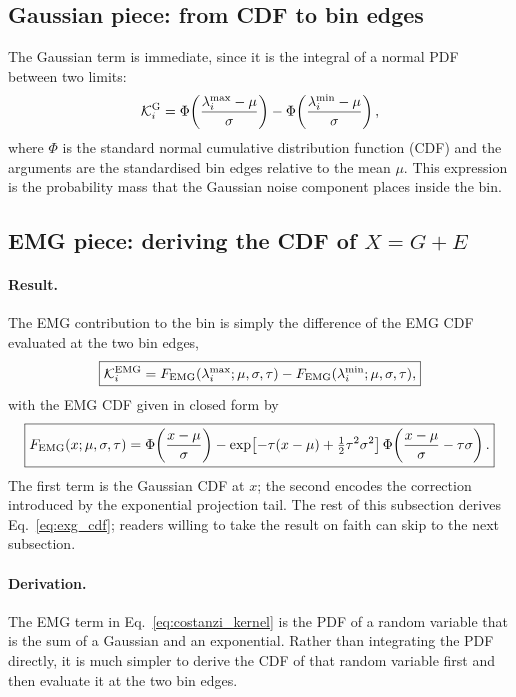 \documentclass[a4paper, 11pt]{article}
\begin{document}
\subsection{Gaussian piece: from CDF to bin edges}

The Gaussian term is immediate, since it is the integral of a normal PDF between two limits:
\begin{equation}
\mathcal K_i^{\rm G}
=
\Phi\!\left(\frac{\lambda_i^{\max}-\mu}{\sigma}\right)
-
\Phi\!\left(\frac{\lambda_i^{\min}-\mu}{\sigma}\right),
\label{eq:KiG}
\end{equation}
where $\Phi$ is the standard normal cumulative distribution function (CDF) and the arguments are the standardised bin edges relative to the mean $\mu$. This expression is the probability mass that the Gaussian noise component places inside the bin.

\subsection{EMG piece: deriving the CDF of $X=G+E$}

\paragraph{Result.}
The EMG contribution to the bin is simply the difference of the EMG CDF evaluated at the two bin edges,
\begin{equation}
\boxed{
\mathcal K_i^{\rm EMG}
=
F_{\rm EMG}(\lambda_i^{\max};\mu,\sigma,\tau)
-
F_{\rm EMG}(\lambda_i^{\min};\mu,\sigma,\tau),
}
\label{eq:Kiexg}
\end{equation}
with the EMG CDF given in closed form by
\begin{equation}
\boxed{
F_{\rm EMG}(x;\mu,\sigma,\tau)
=
\Phi\!\left(\frac{x-\mu}{\sigma}\right)
-
\exp\!\left[-\tau(x-\mu)+\tfrac{1}{2}\tau^{2}\sigma^{2}\right]
\Phi\!\left(\frac{x-\mu}{\sigma}-\tau\sigma\right) .
}
\label{eq:exg_cdf}
\end{equation}
The first term is the Gaussian CDF at $x$; the second encodes the correction introduced by the exponential projection tail. The rest of this subsection derives Eq.~\eqref{eq:exg_cdf}; readers willing to take the result on faith can skip to the next subsection.

\paragraph{Derivation.}
The EMG term in Eq.~\eqref{eq:costanzi_kernel} is the PDF of a random variable that is the sum of a Gaussian and an exponential. Rather than integrating the PDF directly, it is much simpler to derive the CDF of that random variable first and then evaluate it at the two bin edges.
\end{document}
